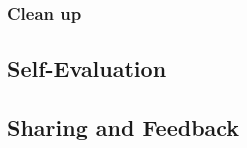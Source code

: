 \subsubsection{Clean up}


\newpage

\subsection{Self-Evaluation}



\newpage

\subsection{Sharing and Feedback}



\newpage

